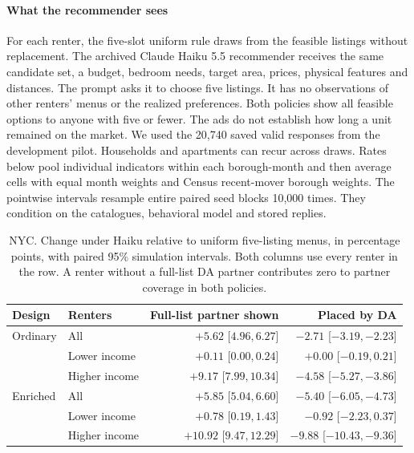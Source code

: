 \paragraph{What the recommender sees}
For each renter, the five-slot uniform rule draws from the feasible listings without replacement. The archived Claude Haiku 5.5 recommender receives the same candidate set, a budget, bedroom needs, target area, prices, physical features and distances. The prompt asks it to choose five listings. It has no observations of other renters' menus or the realized preferences. Both policies show all feasible options to anyone with five or fewer. The ads do not establish how long a unit remained on the market. We used the 20,740 saved valid responses from the development pilot. Households and apartments can recur across draws. Rates below pool individual indicators within each borough-month and then average cells with equal month weights and Census recent-mover borough weights. The pointwise intervals resample entire paired seed blocks 10,000 times. They condition on the catalogues, behavioral model and stored replies.

\begin{table}[t]
\caption{NYC. Change under Haiku relative to uniform five-listing menus, in percentage points, with paired 95\% simulation intervals. Both columns use every renter in the row. A renter without a full-list DA partner contributes zero to partner coverage in both policies.}
\label{tab:nyc-two}
\centering\small
\begin{tabular}{llrr}
\toprule
Design & Renters & Full-list partner shown & Placed by DA\\
\midrule
Ordinary & All & $+5.62$ [$4.96,6.27$] & $-2.71$ [$-3.19,-2.23$]\\
 & Lower income & $+0.11$ [$0.00,0.24$] & $+0.00$ [$-0.19,0.21$]\\
 & Higher income & $+9.17$ [$7.99,10.34$] & $-4.58$ [$-5.27,-3.86$]\\
Enriched & All & $+5.85$ [$5.04,6.60$] & $-5.40$ [$-6.05,-4.73$]\\
 & Lower income & $+0.78$ [$0.19,1.43$] & $-0.92$ [$-2.23,0.37$]\\
 & Higher income & $+10.92$ [$9.47,12.29$] & $-9.88$ [$-10.43,-9.36$]\\
\bottomrule
\end{tabular}
\end{table}

